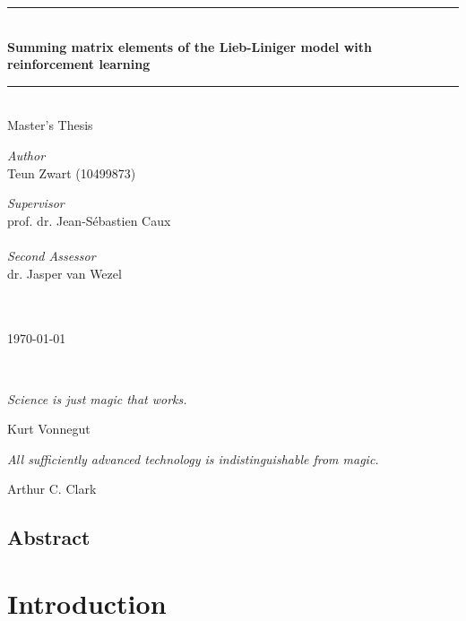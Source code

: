 \documentclass[11pt, a4paper]{report} %
\begin{document}
\begin{titlepage}
	\begin{center}
		\rule{\textwidth}{0.4mm}\\[0.5cm]
		\huge{\textbf{Summing matrix elements of the Lieb-Liniger model with reinforcement learning\\}}
		\rule{\textwidth}{0.4mm}\\[0.5cm]
		\Large{Master's Thesis}\\[0.5cm]
		\begin{minipage}[t]{0.4\textwidth}
			\begin{flushleft}
				\large\emph{Author}\\{Teun Zwart (10499873)}
			\end{flushleft}
		\end{minipage}
		\begin{minipage}[t]{0.4\textwidth}
			\begin{flushright}
				\large\emph{Supervisor}\\{prof. dr. Jean-Sébastien Caux}\\~\\
				\large\emph{Second Assessor}\\{dr. Jasper van Wezel}\\~\\~\\
			\end{flushright}
		\end{minipage}
		\vfill
		\large \today\\
	\end{center}
\end{titlepage}

\newpage
\thispagestyle{empty}

\ 
\vspace{4cm}

\epigraph{\textit{Science is just magic that works.}}{Kurt Vonnegut}

\epigraph{\textit{All sufficiently advanced technology is indistinguishable from magic.}}{Arthur C. Clark}


\tableofcontents

\newpage

\section*{Abstract}

\chapter{Introduction}
\end{document}

